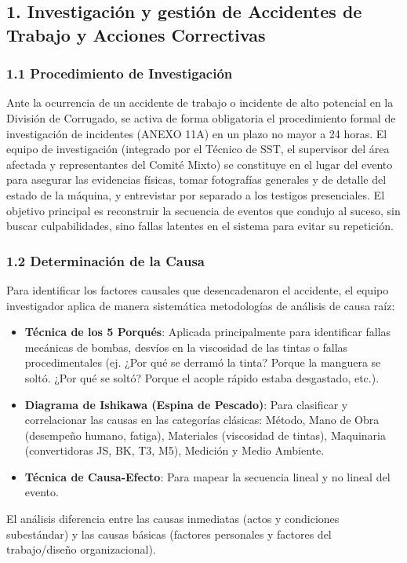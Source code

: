\documentclass[11pt, letterpaper]{article}
\begin{document}
\subsection{1. Investigación y gestión de Accidentes de Trabajo y Acciones Correctivas}
\subsubsection{1.1 Procedimiento de Investigación}
Ante la ocurrencia de un accidente de trabajo o incidente de alto potencial en la División de Corrugado, se activa de forma obligatoria el procedimiento formal de investigación de incidentes (ANEXO 11A) en un plazo no mayor a 24 horas. El equipo de investigación (integrado por el Técnico de SST, el supervisor del área afectada y representantes del Comité Mixto) se constituye en el lugar del evento para asegurar las evidencias físicas, tomar fotografías generales y de detalle del estado de la máquina, y entrevistar por separado a los testigos presenciales. El objetivo principal es reconstruir la secuencia de eventos que condujo al suceso, sin buscar culpabilidades, sino fallas latentes en el sistema para evitar su repetición.

\subsubsection{1.2 Determinación de la Causa}
Para identificar los factores causales que desencadenaron el accidente, el equipo investigador aplica de manera sistemática metodologías de análisis de causa raíz:
\begin{itemize}
    \item \textbf{Técnica de los 5 Porqués}: Aplicada principalmente para identificar fallas mecánicas de bombas, desvíos en la viscosidad de las tintas o fallas procedimentales (ej. ¿Por qué se derramó la tinta? Porque la manguera se soltó. ¿Por qué se soltó? Porque el acople rápido estaba desgastado, etc.).
    \item \textbf{Diagrama de Ishikawa (Espina de Pescado)}: Para clasificar y correlacionar las causas en las categorías clásicas: Método, Mano de Obra (desempeño humano, fatiga), Materiales (viscosidad de tintas), Maquinaria (convertidoras JS, BK, T3, M5), Medición y Medio Ambiente.
    \item \textbf{Técnica de Causa-Efecto}: Para mapear la secuencia lineal y no lineal del evento.
\end{itemize}
El análisis diferencia entre las causas inmediatas (actos y condiciones subestándar) y las causas básicas (factores personales y factores del trabajo/diseño organizacional).
\end{document}
